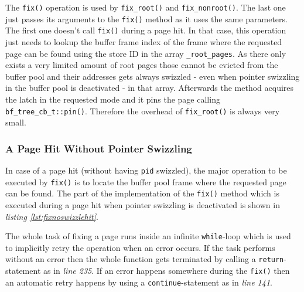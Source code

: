 	The \lstinline{fix()} operation is used by \lstinline{fix_root()} and \lstinline{fix_nonroot()}. The last one just passes its arguments to the \lstinline{fix()} method as it uses the same parameters. The first one doesn't call \lstinline{fix()} during a page hit. In that case, this operation just needs to lookup the buffer frame index of the frame where the requested page can be found using the store ID in the array \lstinline{_root_pages}. As there only exists a very limited amount of root pages those cannot be evicted from the buffer pool and their addresses gets always swizzled - even when pointer swizzling in the buffer pool is deactivated - in that array. Afterwards the method acquires the latch in the requested mode and it pins the page calling \lstinline{bf_tree_cb_t::pin()}. Therefore the overhead of \lstinline{fix_root()} is always very small.
	
\subsubsection{A Page Hit Without Pointer Swizzling} \label{subsubsec:pagehitwithout}

\begin{@empty}
	\lstset{
		language = [ISO]C++,
		style = basic
	}
	\begin{code}[ht!]
		\caption{Implementation of \lstinline{bf_tree_m::fix()} in case of a page hit without having a swizzled page identifier} \label{lst:fixnoswizzlehit}
		
	\end{code}
\end{@empty}
	
	In case of a page hit (without having \lstinline{pid} swizzled), the major operation to be executed by \lstinline{fix()} is to locate the buffer pool frame where the requested page can be found. The part of the implementation of the \lstinline{fix()} method which is executed during a page hit when pointer swizzling is deactivated is shown in \emph{listing \ref{lst:fixnoswizzlehit}}.
	
	The whole task of fixing a page runs inside an infinite \lstinline{while}-loop which is used to implicitly retry the operation when an error occurs. If the task performs without an error then the whole function gets terminated by calling a \lstinline{return}-statement as in \emph{line 235}. If an error happens somewhere during the \lstinline{fix()} then an automatic retry happens by using a \lstinline{continue}-statement as in \emph{line 141}.
	
